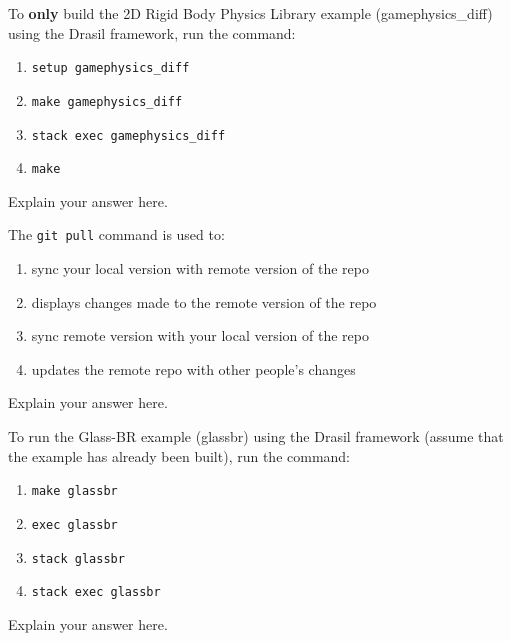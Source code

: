 \documentclass[12pt,fleqn]{examtst}
\begin{document}

\newpage
\noindent
\begin{minipage}{\textwidth}

To \textbf{only} build the 2D Rigid Body Physics Library example (gamephysics\_diff) using the Drasil framework, run the command:

\begin{enumerate}
    \item \lstinline{setup gamephysics_diff}
    \item \lstinline{make gamephysics_diff} \marker
    \item \lstinline{stack exec gamephysics_diff}
    \item \lstinline{make}
\end{enumerate}
Explain your answer here.

The \lstinline{git pull} command is used to:

\begin{enumerate}
    \item sync your local version with remote version of the repo \marker
    \item displays changes made to the remote version of the repo
    \item sync remote version with your local version of the repo
    \item updates the remote repo with other people's changes
\end{enumerate}
Explain your answer here.

To run the Glass-BR example (glassbr) using the Drasil framework (assume that the example has already been built), run the command:

\begin{enumerate}
    \item \lstinline{make glassbr}
    \item \lstinline{exec glassbr}
    \item \lstinline{stack glassbr}
    \item \lstinline{stack exec glassbr} \marker
\end{enumerate}
Explain your answer here.

\end{minipage}
\end{document}
